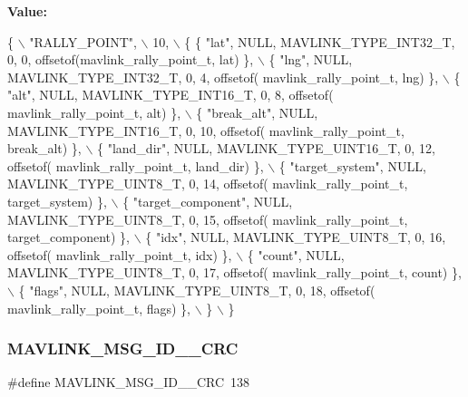 {\bfseries Value\+:}
\begin{DoxyCode}
\{ \(\backslash\)
    \textcolor{stringliteral}{"RALLY\_POINT"}, \(\backslash\)
    10, \(\backslash\)
    \{  \{ \textcolor{stringliteral}{"lat"}, NULL, MAVLINK_TYPE_INT32_T, 0, 0, offsetof(mavlink_rally_point_t, lat) \}, \(\backslash\)
         \{ \textcolor{stringliteral}{"lng"}, NULL, MAVLINK_TYPE_INT32_T, 0, 4, offsetof(
      mavlink_rally_point_t, lng) \}, \(\backslash\)
         \{ \textcolor{stringliteral}{"alt"}, NULL, MAVLINK_TYPE_INT16_T, 0, 8, offsetof(
      mavlink_rally_point_t, alt) \}, \(\backslash\)
         \{ \textcolor{stringliteral}{"break\_alt"}, NULL, MAVLINK_TYPE_INT16_T, 0, 10, offsetof(
      mavlink_rally_point_t, break\_alt) \}, \(\backslash\)
         \{ \textcolor{stringliteral}{"land\_dir"}, NULL, MAVLINK_TYPE_UINT16_T, 0, 12, offsetof(
      mavlink_rally_point_t, land\_dir) \}, \(\backslash\)
         \{ \textcolor{stringliteral}{"target\_system"}, NULL, MAVLINK_TYPE_UINT8_T, 0, 14, offsetof(
      mavlink_rally_point_t, target\_system) \}, \(\backslash\)
         \{ \textcolor{stringliteral}{"target\_component"}, NULL, MAVLINK_TYPE_UINT8_T, 0, 15, offsetof(
      mavlink_rally_point_t, target\_component) \}, \(\backslash\)
         \{ \textcolor{stringliteral}{"idx"}, NULL, MAVLINK_TYPE_UINT8_T, 0, 16, offsetof(
      mavlink_rally_point_t, idx) \}, \(\backslash\)
         \{ \textcolor{stringliteral}{"count"}, NULL, MAVLINK_TYPE_UINT8_T, 0, 17, offsetof(
      mavlink_rally_point_t, count) \}, \(\backslash\)
         \{ \textcolor{stringliteral}{"flags"}, NULL, MAVLINK_TYPE_UINT8_T, 0, 18, offsetof(
      mavlink_rally_point_t, flags) \}, \(\backslash\)
         \} \(\backslash\)
\}
\end{DoxyCode}
\mbox{\label{mavlink__msg__rally__point_8h_ad772ef972625c32486f1992071ee87bc}} 
\subsubsection{M\+A\+V\+L\+I\+N\+K\+\_\+\+M\+S\+G\+\_\+\+I\+D\+\_\+\_\+\+C\+RC}
{\footnotesize\ttfamily \#define M\+A\+V\+L\+I\+N\+K\+\_\+\+M\+S\+G\+\_\+\+I\+D\+\_\+\_\+\+C\+RC~138}


